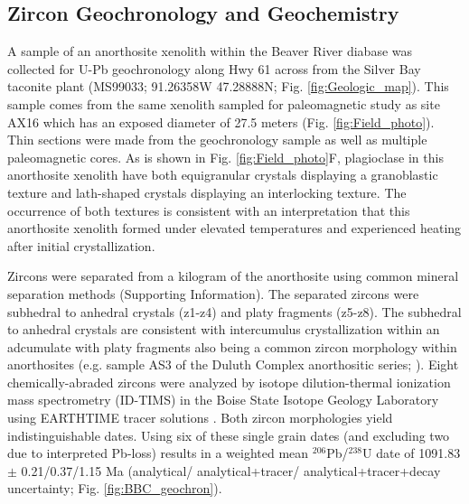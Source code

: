 \documentclass[draft]{agujournal2019}
\begin{document}
\subsection{Zircon Geochronology and Geochemistry}

A sample of an anorthosite xenolith within the Beaver River diabase was collected for U-Pb geochronology along Hwy 61 across from the Silver Bay taconite plant (MS99033; 91.26358\textdegree W 47.28888\textdegree N; Fig. \ref{fig:Geologic_map}). This sample comes from the same xenolith sampled for paleomagnetic study as site AX16 which has an exposed diameter of 27.5 meters (Fig. \ref{fig:Field_photo}). Thin sections were made from the geochronology sample as well as multiple paleomagnetic cores. As is shown in Fig. \ref{fig:Field_photo}F, plagioclase in this anorthosite xenolith have both equigranular crystals displaying a granoblastic texture and lath-shaped crystals displaying an interlocking texture. The occurrence of both textures is consistent with an interpretation that this anorthosite xenolith formed under elevated temperatures and experienced heating after initial crystallization. 

Zircons were separated from a kilogram of the anorthosite using common mineral separation methods (Supporting Information). The separated zircons were subhedral to anhedral crystals (z1-z4) and platy fragments (z5-z8). The subhedral to anhedral crystals are consistent with intercumulus crystallization within an adcumulate with platy fragments also being a common zircon morphology within anorthosites (e.g. sample AS3 of the Duluth Complex anorthositic series; ). Eight chemically-abraded zircons were analyzed by isotope dilution-thermal ionization mass spectrometry (ID-TIMS) in the Boise State Isotope Geology Laboratory using EARTHTIME tracer solutions \cite{Condon2015a}. Both zircon morphologies yield indistinguishable dates. Using six of these single grain dates (and excluding two due to interpreted Pb-loss) results in a weighted mean $^{206}$Pb/$^{238}$U date of 1091.83 $\pm$ 0.21/0.37/1.15 Ma (analytical/ analytical+tracer/ analytical+tracer+decay uncertainty; Fig. \ref{fig:BBC_geochron}). 
\end{document}
